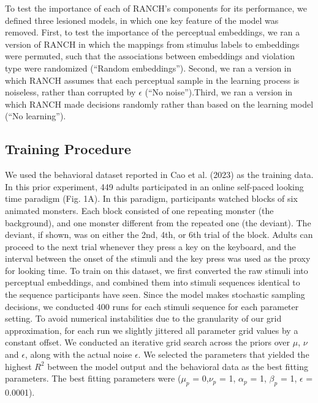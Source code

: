\documentclass[10pt, letterpaper]{article}
\begin{document}
To test the importance of each of RANCH's components for its
performance, we defined three lesioned models, in which one key feature
of the model was removed. First, to test the importance of the
perceptual embeddings, we ran a version of RANCH in which the mappings
from stimulus labels to embeddings were permuted, such that the
associations between embeddings and violation type were randomized
(``Random embeddings''). Second, we ran a version in which RANCH assumes
that each perceptual sample in the learning process is noiseless, rather
than corrupted by \(\epsilon\) (``No noise'').Third, we ran a version in
which RANCH made decisions randomly rather than based on the learning
model (``No learning'').

\hypertarget{training-procedure}{%
\subsection{Training Procedure}\label{training-procedure}}

We used the behavioral dataset reported in Cao et al. (2023) as the
training data. In this prior experiment, 449 adults participated in an
online self-paced looking time paradigm (Fig. 1A). In this paradigm,
participants watched blocks of six animated monsters. Each block
consisted of one repeating monster (the background), and one monster
different from the repeated one (the deviant). The deviant, if shown,
was on either the 2nd, 4th, or 6th trial of the block. Adults can
proceed to the next trial whenever they press a key on the keyboard, and
the interval between the onset of the stimuli and the key press was used
as the proxy for looking time. To train on this dataset, we first
converted the raw stimuli into perceptual embeddings, and combined them
into stimuli sequences identical to the sequence participants have seen.
Since the model makes stochastic sampling decisions, we conducted 400
runs for each stimuli sequence for each parameter setting. To avoid
numerical instabilities due to the granularity of our grid
approximation, for each run we slightly jittered all parameter grid
values by a constant offset. We conducted an iterative grid search
across the priors over \(\mu\), \(\nu\) and \(\epsilon\), along with the
actual noise \(\epsilon\). We selected the parameters that yielded the
highest \(R^2\) between the model output and the behavioral data as the
best fitting parameters. The best fitting parameters were (\(\mu_{p}\) =
0,\(\nu_{p}\) = 1, \(\alpha_{p}\) = 1, \(\beta_{p}\) = 1, \(\epsilon\) =
0.0001).
\end{document}
